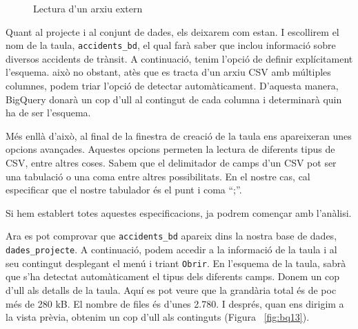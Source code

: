 \documentclass[12pt,longbibliography]{article}
\theoremstyle{definition}
\theoremstyle{remark}
\begin{document}
\begin{figure}[h!]
\par
{}%
\hfill
{}%
\par

\caption{Lectura d'un arxiu extern}
\label{fig:bq12}
\end{figure}


Quant al projecte i al conjunt de dades, els deixarem com estan. I escollirem el nom de la taula, \verb|accidents_bd|, el qual farà saber que inclou informació sobre diversos accidents de trànsit. A continuació, tenim l'opció de definir explícitament l'esquema. això no obstant, atès que es tracta d'un arxiu CSV amb múltiples columnes, podem triar l'opció de detectar automàticament. D'aquesta manera, BigQuery donarà un cop d'ull al contingut de cada columna i determinarà quin ha de ser l'esquema. 



Més enllà d'això, al final de la finestra de creació de la taula ens apareixeran unes opcions avançades. Aquestes opcions permeten la lectura de diferents tipus de CSV, entre altres coses. Sabem que el delimitador de camps d’un CSV pot ser una tabulació o una coma entre altres possibilitats. En el nostre cas, cal especificar que el nostre tabulador és el punt i coma “;”. 



Si hem establert totes aquestes especificacions, ja podrem començar amb l’anàlisi.



Ara es pot comprovar que \verb|accidents_bd| apareix dins la nostra base de dades, \verb|dades_projecte|. A continuació, podem accedir a la informació de la taula i al seu contingut desplegant el menú i triant \texttt{Obrir}. En l'esquema de la taula, sabrà que s'ha detectat automàticament el tipus dels diferents camps. Donem un cop d'ull als detalls de la taula. Aquí es pot veure que la grandària total és de poc més de 280 kB. El nombre de files és d'unes 2.780. I després, quan ens dirigim a la vista prèvia, obtenim un cop d'ull als continguts (Figura ~\ref{fig:bq13}). 
\end{document}
